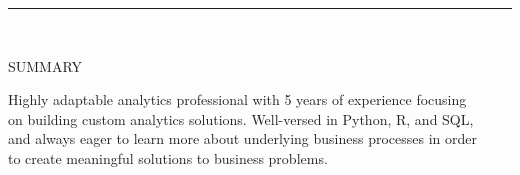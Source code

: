 \documentclass[12pt]{article}
\newcommand\tab[1][1cm]{\hspace*{#1}}
\newcommand\header[1][Section Header]{
    \vspace*{-2mm}
    \rule{6.5in}{3pt} \\
    \smallskip
    \begin{large}
	    \textsc{\textcolor{lblue}{#1}}
    \end{large}
    \medskip
}
\begin{document}
  \pagestyle{empty} %

  \begin{flushleft}
    \header[SUMMARY]

    \tab Highly adaptable analytics professional with 5 years of experience focusing \\
    \tab on building custom analytics solutions. Well-versed in Python, R, and SQL, \\
    \tab and always eager to learn more about underlying business processes in order \\
    \tab to create meaningful solutions to business problems. \\

    \smallskip
  \end{flushleft}
\end{document}
